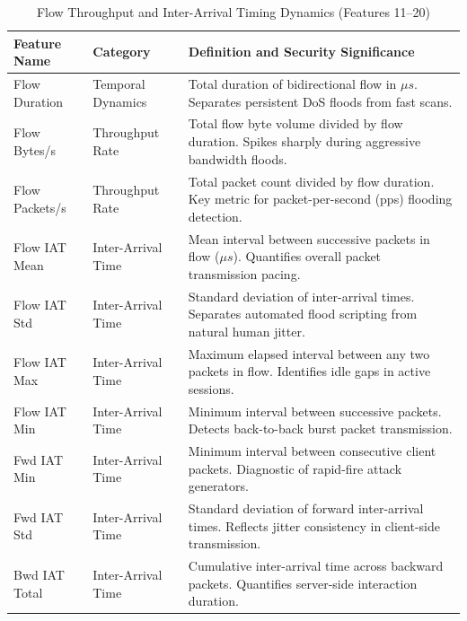 \documentclass[12pt,a4paper]{report}
\begin{document}
\begin{table}[H]
\centering
\small
\renewcommand{\arraystretch}{1.15}
\begin{tabularx}{\textwidth}{|p{4.3cm}|p{2.8cm}|X|}
\hline
\textbf{Feature Name} & \textbf{Category} & \textbf{Definition and Security Significance} \\
\hline
Flow Duration & Temporal Dynamics & Total duration of bidirectional flow in $\mu s$. Separates persistent DoS floods from fast scans. \\
\hline
Flow Bytes/s & Throughput Rate & Total flow byte volume divided by flow duration. Spikes sharply during aggressive bandwidth floods. \\
\hline
Flow Packets/s & Throughput Rate & Total packet count divided by flow duration. Key metric for packet-per-second (pps) flooding detection. \\
\hline
Flow IAT Mean & Inter-Arrival Time & Mean interval between successive packets in flow ($\mu s$). Quantifies overall packet transmission pacing. \\
\hline
Flow IAT Std & Inter-Arrival Time & Standard deviation of inter-arrival times. Separates automated flood scripting from natural human jitter. \\
\hline
Flow IAT Max & Inter-Arrival Time & Maximum elapsed interval between any two packets in flow. Identifies idle gaps in active sessions. \\
\hline
Flow IAT Min & Inter-Arrival Time & Minimum interval between successive packets. Detects back-to-back burst packet transmission. \\
\hline
Fwd IAT Min & Inter-Arrival Time & Minimum interval between consecutive client packets. Diagnostic of rapid-fire attack generators. \\
\hline
Fwd IAT Std & Inter-Arrival Time & Standard deviation of forward inter-arrival times. Reflects jitter consistency in client-side transmission. \\
\hline
Bwd IAT Total & Inter-Arrival Time & Cumulative inter-arrival time across backward packets. Quantifies server-side interaction duration. \\
\hline
\end{tabularx}
\caption{Flow Throughput and Inter-Arrival Timing Dynamics (Features 11--20)}
\label{tab:feature_dictionary_part2}
\end{table}
\end{document}
